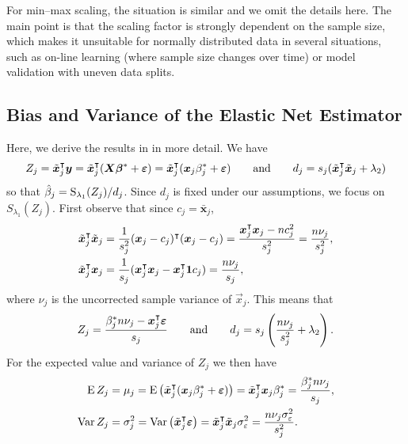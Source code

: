 For min--max scaling, the situation is similar and we omit the details here. The main point
is that the scaling factor is strongly dependent on the sample size, which makes it
unsuitable for normally distributed data in several situations, such as on-line learning
(where sample size changes over time) or model validation with uneven data splits.

\subsection{Bias and Variance of the Elastic Net Estimator}
\label{sec:bias-var-deriv}

Here, we derive the results in  in more detail. We have
\[
  {Z_j} = \tilde{\boldsymbol{x}}_j^\intercal \boldsymbol{y} = \tilde{\boldsymbol{x}}_j^\intercal(\boldsymbol{X}\boldsymbol{\beta}^* + \boldsymbol{\varepsilon}) = \tilde{\boldsymbol{x}}_j^\intercal (\boldsymbol{x}_j\beta_j^* + \boldsymbol{\varepsilon})
  \qquad
  \text{and}
  \qquad
  d_j = s_j(\tilde{\boldsymbol{x}}_j^\intercal \tilde{\boldsymbol{x}}_j + \lambda_2)
\]
so that \(\hat{\beta}_j = \operatorname{S}_{\lambda_1}({Z_j})/d_j\). Since \(d_j\) is fixed under our
assumptions, we focus on \(S_{\lambda_1}({Z_j})\). First observe that since \(c_j =
\bar{\bm{x}}_j\),
\[
  \begin{aligned}
    \tilde{\boldsymbol{x}}_j^\intercal \tilde{\boldsymbol{x}}_j & = \frac{1}{s_j^2}(\boldsymbol{x}_j - c_j)^\intercal (\boldsymbol{x}_j - c_j) = \frac{\boldsymbol{x}_j^\intercal\boldsymbol{x}_j - nc_j^2}{s^2_j} = \frac{n \nu_j}{s_j^2}, \\
    \tilde{\boldsymbol{x}}_j^\intercal \boldsymbol{x}_j         & = \frac{1}{s_j}(\boldsymbol{x}_j^\intercal \boldsymbol{x}_j - \boldsymbol{x}_j^\intercal \boldsymbol{1} c_j) = \frac{n \nu_j}{s_j},
  \end{aligned}
\]
where \(\nu_j\) is the uncorrected sample variance of \(\vec{x}_j\). This means that
\begin{equation}
  {Z_j} = \frac{\beta_j^* n \nu_j- \boldsymbol{x}_j^\intercal \boldsymbol{\varepsilon}}{s_j}
  \qquad\text{and}\qquad
  d_j = s_j\left(\frac{n \nu_j}{s_j^2} + \lambda_2\right).
\end{equation}
For the expected value and variance of \({Z_j}\) we then have
\begin{align*}
  \operatorname{E} {Z_j}   & = \mu_j = \operatorname{E} \left( \tilde{\boldsymbol{x}}_j^\intercal (\boldsymbol{x}_j\beta^*_j + \boldsymbol{\varepsilon}) \right)  = \tilde{\boldsymbol{x}}_j^\intercal\boldsymbol{x}_j \beta^*_j = \frac{\beta_j^* n \nu_j}{s_j},            \\
  \operatorname{Var} {Z_j} & = \sigma_j^2 = \operatorname{Var}\left(\tilde{\boldsymbol{x}}_j ^\intercal \boldsymbol{\varepsilon}\right) = \tilde{\boldsymbol{x}}_j^\intercal \tilde{\boldsymbol{x}}_j\sigma_\varepsilon^2 = \frac{n\nu_j\sigma_\varepsilon^2}{s_j^2}.
\end{align*}

